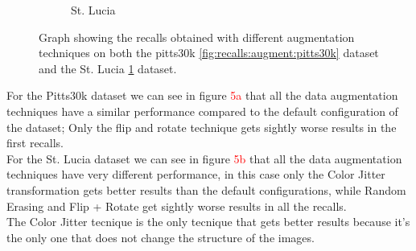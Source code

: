 \documentclass[10pt,twocolumn,letterpaper]{article}
\begin{document}
\begin{figure}[!h]
\begin{subfigure}[b]{0.23\textwidth}
		\caption{St. Lucia}
		\label{fig:recalls:augment:st_lucia}
	\end{subfigure}
	\caption{Graph showing the recalls obtained with different augmentation techniques on both the pitts30k \ref{fig:recalls:augment:pitts30k} dataset and the St. Lucia \ref{fig:recalls:augment:st_lucia} dataset.}
	\label{fig:recalls:augment}
\end{figure}
For the Pitts30k dataset we can see in figure \textcolor{red}{5a} that all the data augmentation techniques have a similar performance compared to the default configuration of the dataset; Only the flip and rotate technique gets sightly worse results in the first recalls.\\
For the St. Lucia dataset we can see in figure \textcolor{red}{5b} that all the data augmentation techniques have very different performance, in this case only the Color Jitter transformation gets better results than the default configurations, while  Random Erasing and Flip + Rotate get sightly worse results in all the recalls.\\
The Color Jitter tecnique is the only tecnique that gets better results because it's the only one that does not change the structure of the images.
\end{document}
